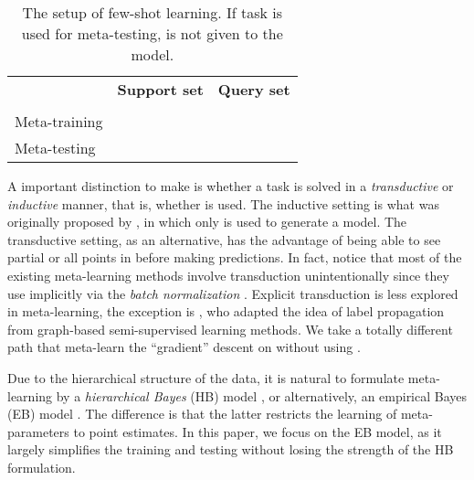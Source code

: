 \documentclass{article} \usepackage{iclr2020_conference,times}
\newcommand{\chk}{{\centering\checkmark}}
\newcommand{\xmark}{\ding{55}}
\newcommand{\crs}{{\centering\xmark}}
\begin{document}
\begin{table}[ht]
    \centering
	\begin{tabular}{lccc}
    \toprule
        & \multicolumn{1}{c}{\textbf{Support set}} & \multicolumn{2}{c}{\textbf{Query set}} \\
        &  &  &  \\
    \midrule
	    Meta-training & \chk & \chk & \chk \\
	    Meta-testing & \chk & \chk & \crs \\
	\bottomrule
    \end{tabular}
    \caption{The setup of few-shot learning. If task  is used for meta-testing,  is not given to the model.}
\label{tab:fs}
\end{table}

A important distinction to make is whether a task is solved in a \emph{transductive} or \emph{inductive} manner, 
that is, whether  is used. The inductive setting is what was originally proposed by \citet{vinyals2016matching},
in which only  is used to generate a model.
The transductive setting, as an alternative, has the advantage of being able to see partial or all points in  before making predictions.
In fact, \citet{nichol2018first} notice that most of the existing meta-learning methods involve transduction unintentionally
since they use  implicitly via the \emph{batch normalization} \citep{ioffe2015batch}.
Explicit transduction is less explored in meta-learning, the exception is \citet{liu2018learning}, 
who adapted the idea of label propagation \citep{zhu2003semi} from graph-based semi-supervised learning methods.
We take a totally different path that meta-learn the ``gradient'' descent on  without using .


Due to the hierarchical structure of the data, it is natural to formulate meta-learning by 
a \emph{hierarchical Bayes} (HB) model \citep{good1980some,berger1985}, 
or alternatively, an empirical Bayes (EB) model \citep{robbins1985empirical,kucukelbir2014population}. 
The difference is that the latter restricts the learning of meta-parameters to point estimates.
In this paper, we focus on the EB model, as it largely simplifies the training and testing without losing the strength of the HB formulation.
\end{document}
